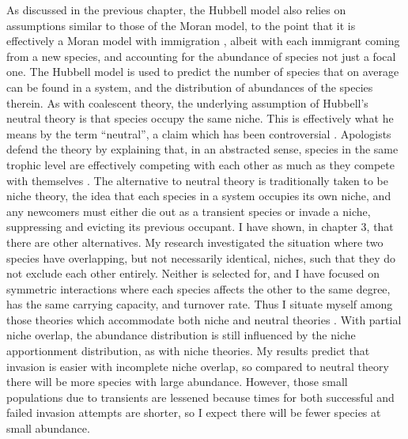 As discussed in the previous chapter, the Hubbell model also relies on assumptions similar to those of the Moran model, to the point that it is effectively a Moran model with immigration \cite{Hubbell2001}, albeit with each immigrant coming from a new species, and accounting for the abundance of species not just a focal one. 
The Hubbell model is used to predict the number of species that on average can be found in a system, and the distribution of abundances of the species therein. 
As with coalescent theory, the underlying assumption of Hubbell's neutral theory is that species occupy the same niche. 
This is effectively what he means by the term ``neutral'', a claim which has been controversial \cite{Ricklefs2006,Kalyuzhny2014,Carroll2015}. 
Apologists defend the theory by explaining that, in an abstracted sense, species in the same trophic level are effectively competing with each other as much as they compete with themselves \cite{Hubbell2006,Rosindell2011}. 
The alternative to neutral theory is traditionally taken to be niche theory, the idea that each species in a system occupies its own niche, and any newcomers must either die out as a transient species or invade a niche, suppressing and evicting its previous occupant. 
I have shown, in chapter 3, that there are other alternatives. 
My research investigated the situation where two species have overlapping, but not necessarily identical, niches, such that they do not exclude each other entirely. 
Neither is selected for, and I have focused on symmetric interactions where each species affects the other to the same degree, has the same carrying capacity, and turnover rate. 
Thus I situate myself among those theories which accommodate both niche and neutral theories \cite{Leibold2006,Ofiteru2010,Pigolotti2013,Fisher2014,Kessler2015}. 
With partial niche overlap, the abundance distribution is still influenced by the niche apportionment distribution, as with niche theories. %
My results predict that invasion is easier with incomplete niche overlap, so compared to neutral theory there will be more species with large abundance. 
However, those small populations due to transients are lessened because times for both successful and failed invasion attempts are shorter, so I expect there will be fewer species at small abundance. 



